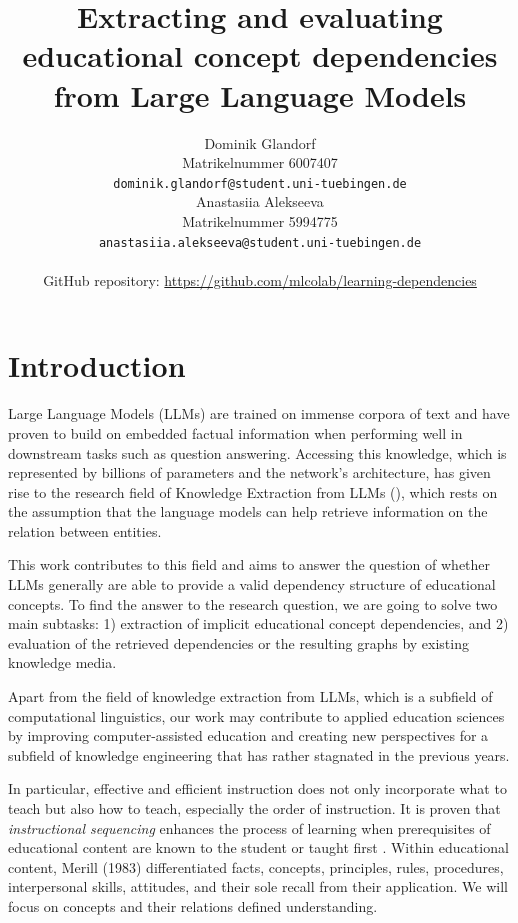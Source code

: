 \documentclass{article}
\title{Extracting and evaluating educational concept dependencies from Large Language Models}
\author{%
  Dominik Glandorf\\
  Matrikelnummer 6007407\\
  \texttt{dominik.glandorf@student.uni-tuebingen.de} \\
  \And
  Anastasiia Alekseeva\\
  Matrikelnummer 5994775\\
  \texttt{anastasiia.alekseeva@student.uni-tuebingen.de} \\
  \\
  GitHub repository: \url{https://github.com/mlcolab/learning-dependencies}
}
\begin{document}
\vspace*{-5mm}
\maketitle
\vspace*{-5mm}

\begin{abstract}





\end{abstract}

\section{Introduction}
Large Language Models (LLMs) are trained on immense corpora of text and have proven to build on embedded factual information when performing well in downstream tasks such as question answering. Accessing this knowledge, which is represented by billions of parameters and the network's architecture, has given rise to the research field of Knowledge Extraction from LLMs (\cite{cohen2023crawling}), which rests on the assumption that the language models can help retrieve information on the relation between entities. 

This work contributes to this field and aims to answer the question of whether LLMs generally are able to provide a valid dependency structure of educational concepts. To find the answer to the research question, we are going to solve two main subtasks: 1) extraction of implicit educational concept dependencies, and 2) evaluation of the retrieved dependencies or the resulting graphs by existing knowledge media.

Apart from the field of knowledge extraction from LLMs, which is a subfield of computational linguistics, our work may contribute to applied education sciences by improving computer-assisted education and creating new perspectives for a subfield of knowledge engineering that has rather stagnated in the previous years.

In particular, effective and efficient instruction does not only incorporate what to teach but also how to teach, especially the order of instruction.  It is proven that \textit{instructional sequencing} enhances the process of learning when prerequisites of educational content are known to the student or taught first \citep{morrison2019designing}.
Within educational content, Merill (1983) differentiated facts, concepts, principles, rules, procedures, interpersonal skills, attitudes, and their sole recall from their application.
We will focus on concepts and their relations defined understanding. 
\end{document}
